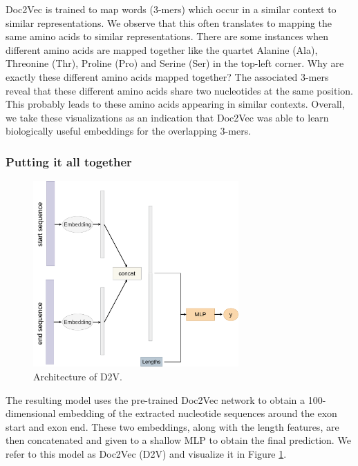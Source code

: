 Doc2Vec is trained to map words (3-mers) which occur in a similar context to similar representations. We observe that this often translates to mapping the same amino acids to similar representations. There are some instances when different amino acids are mapped together like the quartet Alanine (Ala), Threonine (Thr), Proline (Pro) and Serine (Ser) in the top-left corner. Why are exactly these different amino acids mapped together? The associated 3-mers reveal that these different amino acids share two nucleotides at the same position. This probably leads to these amino acids appearing in similar contexts.
Overall, we take these visualizations as an indication that Doc2Vec was able to learn biologically useful embeddings for the overlapping 3-mers.
\subsubsection{Putting it all together} \label{subsubsec:d2vinference}

\begin{figure}
	\includegraphics[width=0.7\textwidth]{../visualizations/ch4-methods/d2v.pdf} 	
	\caption{
		Architecture of D2V. 
	}
	\label{fig:d2v_arch}
\end{figure}

The resulting model uses the pre-trained Doc2Vec network to obtain a 100-dimensional embedding of the extracted nucleotide sequences around the exon start and exon end. These two embeddings, along with the length features, are then concatenated and given to a shallow MLP to obtain the final prediction. We refer to this model as Doc2Vec (D2V) and visualize it in Figure \ref{fig:d2v_arch}. 



